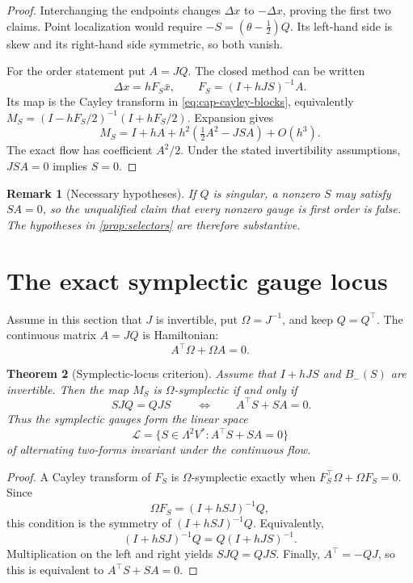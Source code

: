 \documentclass[11pt,a4paper]{article}
\newtheorem{theorem}{Theorem}[section]
\newtheorem{remark}[theorem]{Remark}
\newcommand{\cL}{\mathcal L}
\begin{document}
\begin{proof}
Interchanging the endpoints changes \(\Delta x\) to \(-\Delta x\), proving
the first two claims. Point localization would require
\(-S=(\theta-\tfrac12)Q\). Its left-hand side is skew and its right-hand
side symmetric, so both vanish.

For the order statement put \(A=JQ\). The closed method can be written
\[
 \Delta x=hF_S\bar x,\qquad
 F_S=(I+hJS)^{-1}A.
\]
Its map is the Cayley transform in
\cref{eq:cap-cayley-blocks}, equivalently
\(M_S=(I-hF_S/2)^{-1}(I+hF_S/2)\).
Expansion gives
\begin{equation}\label{eq:order-expansion}
 M_S=I+hA+h^2\left(\tfrac12A^2-JSA\right)+O(h^3).
\end{equation}
The exact flow has coefficient \(A^2/2\). Under the stated
invertibility assumptions, \(JSA=0\) implies \(S=0\).
\end{proof}

\begin{remark}[Necessary hypotheses]
If \(Q\) is singular, a nonzero \(S\) may satisfy \(SA=0\), so the
unqualified claim that every nonzero gauge is first order is false.
The hypotheses in \cref{prop:selectors} are therefore substantive.
\end{remark}

\section{The exact symplectic gauge locus}

Assume in this section that \(J\) is invertible, put
\(\Omega=J^{-1}\), and keep \(Q=Q^\top\). The continuous matrix
\(A=JQ\) is Hamiltonian:
\[
 A^\top\Omega+\Omega A=0.
\]

\begin{theorem}[Symplectic-locus criterion]\label{thm:symplectic-locus}
Assume that \(I+hJS\) and \(B_-(S)\) are invertible.  Then the map \(M_S\)
is \(\Omega\)-symplectic if and only if
\begin{equation}\label{eq:locus}
 \boxed{\ SJQ=QJS\ }
 \qquad\Longleftrightarrow\qquad
 A^\top S+SA=0.
\end{equation}
Thus the symplectic gauges form the linear space
\[
 \cL=\{S\in\Lambda^2V^*:A^\top S+SA=0\}
\]
of alternating two-forms invariant under the continuous flow.
\end{theorem}

\begin{proof}
A Cayley transform of \(F_S\) is \(\Omega\)-symplectic exactly when
\(F_S^\top\Omega+\Omega F_S=0\). Since
\[
 \Omega F_S=(I+hSJ)^{-1}Q,
\]
this condition is the symmetry of \((I+hSJ)^{-1}Q\). Equivalently,
\[
 (I+hSJ)^{-1}Q=Q(I+hJS)^{-1}.
\]
Multiplication on the left and right yields \(SJQ=QJS\). Finally,
\(A^\top=-QJ\), so this is equivalent to \(A^\top S+SA=0\).
\end{proof}
\end{document}
